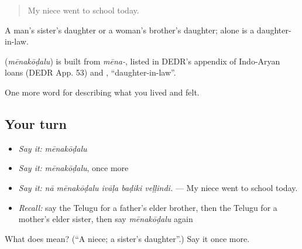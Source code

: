 \begin{quote}
My niece went to school today.
\end{quote}

A man's sister's daughter or a woman's brother's daughter;  alone is a daughter-in-law.

\begin{cousinweb}
\textbf{} (\emph{mēnakōḍalu}) is built from \emph{mēna-}, listed in DEDR's appendix of Indo-Aryan loans (DEDR App. 53) and , \textquotedblleft{}daughter-in-law\textquotedblright{}.
\end{cousinweb}

\begin{grammarlens}[title={What you've built}]
One more word for describing what you lived and felt.
\end{grammarlens}

\subsection*{Your turn}
\begin{itemize}
\raggedright
  \item \emph{Say it:} \emph{mēnakōḍalu}
  \item \emph{Say it:} \emph{mēnakōḍalu}, once more
  \item \emph{Say it:} \emph{nā mēnakōḍalu ivāḷa baḍiki veḷḷindi.} — My niece went to school today.
  \item \emph{Recall:} say the Telugu for a father's elder brother, then the Telugu for a mother's elder sister, then say \emph{mēnakōḍalu} again
\end{itemize}

\begin{tcolorbox}[breakable,colback=teal!4,colframe=teal!35!black,title={Before you move on}]
What does  mean? (\textquotedblleft{}A niece; a sister's daughter\textquotedblright{}.) Say it once more.
\end{tcolorbox}
